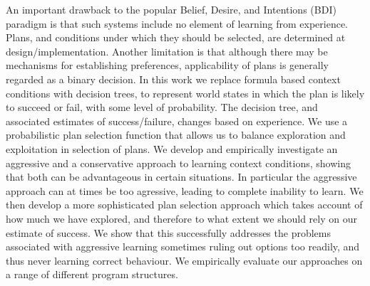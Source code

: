%
An important drawback to the popular Belief, Desire, and Intentions
(BDI) paradigm is that such systems include no
element of learning from experience. Plans, and conditions under
which they should be selected, are determined at
design/implementation. 
%
Another limitation is that although there may be mechanisms for 
establishing preferences, applicability of plans is generally
regarded as a binary decision. 
% 
In this work we replace formula based context conditions with decision
trees, to represent world states in which
the plan is likely to succeed or fail, with some level of probability.
The decision tree, and associated estimates of success/failure,
changes based on experience. We use a probabilistic plan selection function
that allows us to balance exploration and exploitation in selection of
plans.
%
We develop and empirically investigate an aggressive and a
conservative approach to learning context conditions, showing that
both can be advantageous in certain situations. In particular the
aggressive approach can at times be too agressive, leading to complete
inability to learn.
%
We then develop a more sophisticated plan selection approach which
takes account of how much we have explored, and therefore to what
extent we should rely on our estimate of success. We show that this
successfully addresses the problems associated with aggressive
learning sometimes ruling out options too readily, and thus never
learning correct behaviour.
% 
We empirically evaluate our approaches on a range of
different program structures.

